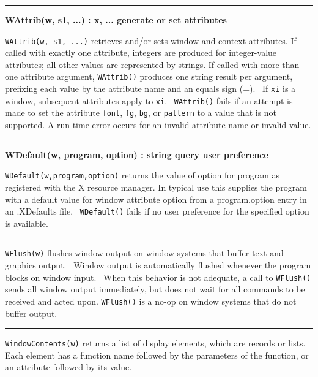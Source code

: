 \bigskip\hrule\vspace{0.1cm}
\noindent
{\bf WAttrib(w, s1, ...) : x, ... \hfill generate or set attributes}

\noindent
\texttt{WAttrib(w, s1, ...)} retrieves and/or sets window and context
attributes. If called with exactly one attribute, integers are produced
for integer-value attributes; all other values are represented by
strings. If called with more than one attribute argument,
\texttt{WAttrib()} produces one string result per argument, prefixing
each value by the attribute name and an equals sign (=). \ If
\texttt{xi} is a window, subsequent attributes apply to \texttt{xi}.
\ \texttt{WAttrib()} fails if an attempt is made to set the attribute
\texttt{font}, \texttt{fg}, \texttt{bg}, or \texttt{pattern} to a value
that is not supported. A run-time error occurs for an invalid attribute
name or invalid value.

\bigskip\hrule\vspace{0.1cm}
\noindent
{\bf WDefault(w, program, option) : string \hfill query user preference}

\noindent
\texttt{WDefault(w,program,option)} returns the value of option for
program as registered with the X resource manager. In typical use this
supplies the program with a default value for window attribute option
from a program.option entry in an .XDefaults file.
\ \texttt{WDefault()} fails if no user preference for the specified
option is available.

\bigskip\hrule\vspace{0.1cm}

\noindent
\texttt{WFlush(w)} flushes window output on window systems that buffer
text and graphics output. \ Window output is automatically flushed
whenever the program blocks on window input. \ When this behavior is
not adequate, a call to \texttt{WFlush()} sends all window output
immediately, but does not wait for all commands to be received and
acted upon. \texttt{WFlush()} is a no-op on window systems that do not
buffer output.

\bigskip\hrule\vspace{0.1cm}

\noindent
\texttt{WindowContents(w)} returns a list of display elements, which are
records or lists. Each element has a function name followed by the
parameters of the function, or an attribute followed by its value.

